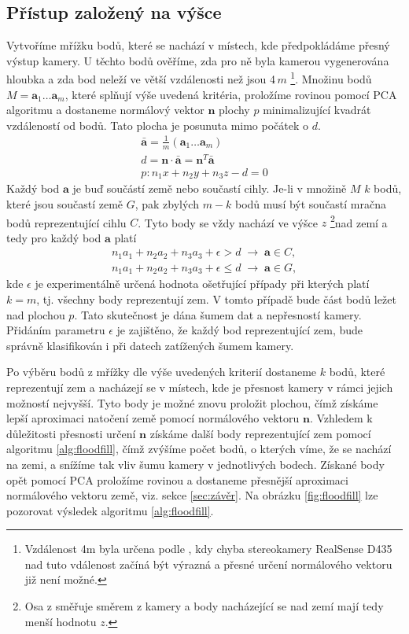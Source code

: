\documentclass[twoside]{ctuthesis}
\newcommand{\tl}[1]{$\mathbf{#1}$}
\begin{document}
\subsection{Přístup založený na výšce}
\label{subsec:height}
Vytvoříme mřížku bodů, které se nachází v místech, kde předpokládáme přesný výstup kamery. U těchto bodů ověříme, zda pro ně byla kamerou vygenerována hloubka a zda bod neleží ve větší vzdálenosti než jsou 4\,$\si{m}$ \footnote{Vzdálenost 4m byla určena podle \cite{keselman2017intel}, kdy chyba stereokamery RealSense D435 nad tuto vdálenost začíná být výrazná a přesné určení normálového vektoru již není možné.}. Množinu bodů $M = \mathbf{a}_1 \dotsc \mathbf{a}_m$, které splňují výše uvedená kritéria, proložíme rovinou pomocí PCA algoritmu a dostaneme normálový vektor \tl{n} plochy $p$ minimalizující kvadrát vzdáleností od bodů. Tato plocha je posunuta mimo počátek o $d$.
\begin{align}
    \mathbf{\bar{a}} = \frac{1}{m}\left( \mathbf{a}_1 \dotsc \mathbf{a}_m \right) \\
    d = \mathbf{n} \cdot \mathbf{\bar{a}} = \mathbf{n}^T \mathbf{\bar{a}} \\
    p: n_1x + n_2y + n_3z - d = 0 \label{normal_plane}
\end{align}
Každý bod \tl{a} je buď součástí země nebo součastí cihly. Je-li v množině $M$ $k$ bodů, které jsou součastí země $G$, pak zbylých $m - k$ bodů musí být součastí mračna bodů reprezentující cihlu $C$. Tyto body se vždy nachází ve výšce $z$ \footnote{Osa z směřuje směrem z kamery a body nacházející se nad zemí mají tedy menší hodnotu $z$.}nad zemí a tedy pro každý bod \tl{a} platí
\begin{align}
    n_1a_1 + n_2a_2 + n_3a_3 + \epsilon > d \; \rightarrow \; \mathbf{a} \in C,  \\
    n_1a_1 + n_2a_2 + n_3a_3 + \epsilon \leq d \; \rightarrow \; \mathbf{a} \in G,
\end{align}
kde $\epsilon$ je experimentálně určená hodnota ošetřující případy při kterých platí $k = m$, tj. všechny body reprezentují zem. V tomto případě bude část bodů ležet nad plochou $p$. Tato skutečnost je dána šumem dat a nepřesností kamery. Přidáním parametru $\epsilon$ je zajištěno, že každý bod reprezentující zem, bude správně klasifikován i při datech zatížených šumem kamery.

Po výběru bodů z mřížky dle výše uvedených kriterií dostaneme $k$ bodů, které reprezentují zem a nacházejí se v místech, kde je přesnost kamery v rámci jejich možností nejvyšší. Tyto body je možné znovu proložit plochou, čímž získáme lepší aproximaci natočení země pomocí normálového vektoru \tl{n}. Vzhledem k důležitosti přesnosti určení \tl{n} získáme další body reprezentující zem pomocí algoritmu \ref{alg:floodfill}, čímž zvýšíme počet bodů, o kterých víme, že se nachází na zemi, a snížíme tak vliv šumu kamery v jednotlivých bodech. Získané body opět pomocí PCA proložíme rovinou a dostaneme přesnější aproximaci normálového vektoru země, viz. sekce \ref{sec:závěr}. Na obrázku \ref{fig:floodfill} lze pozorovat výsledek algoritmu \ref{alg:floodfill}.
    
\end{document}
